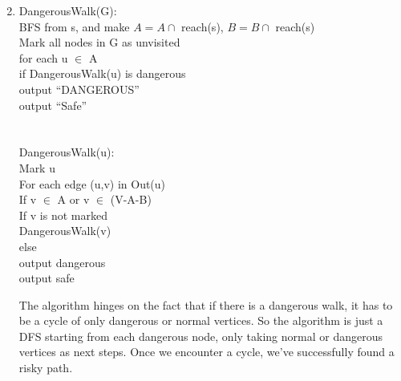 
\usepackage{amsmath, verbatim, tikz, float}

\usetikzlibrary{arrows,automata}

\oddsidemargin 0in
\evensidemargin 0in
\textwidth 6.5in
\topmargin -0.5in
\textheight 9.0in
\newcommand{\norm}[1]{\left\lVert #1 \right\rVert}


\pagestyle{myheadings}

\begin{enumerate}
  \setcounter{enumi}{1} 
\item
  \begin{algorithm}
    DangerousWalk(G):\\
    \> BFS from s, and make $A = A \cap $ reach(s), $B = B \cap$ reach(s)\\
    \>Mark all nodes in G as unvisited\\
    \>for each u $\in$ A\\
    \>\>if DangerousWalk(u) is dangerous\\
    \>\>\> output ``DANGEROUS''\\
    \>output ``Safe''\\\\\\

    DangerousWalk(u):\\
    \>Mark u\\
    \>For each edge (u,v) in Out(u)\\
    \>\>If v $\in$ A or v $\in$ (V-A-B)\\
    \>\>\>If v is not marked\\
    \>\>\>\>DangerousWalk(v)\\
    \>\>\>else\\
    \>\>\>\>output dangerous\\
    \>output safe\\
  \end{algorithm}
  
  The algorithm hinges on the fact that if there is a dangerous walk, it has to be a cycle of only dangerous or normal vertices. So the algorithm is just a DFS starting from each dangerous node, only taking normal or dangerous vertices as next steps. Once we encounter a cycle, we've successfully found a risky path.
\end{enumerate}
